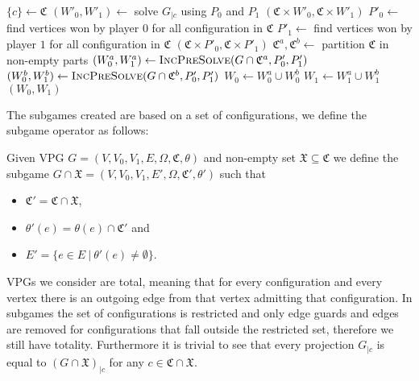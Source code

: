 \begin{algorithm}
	\caption{$\textsc{IncPreSolve}(VPG G = (V,V_0,V_1, E, \Omega, \mathfrak{C}, \theta), P_0,P_1)$}\label{alg_IncPreSolveBasic}
	\begin{algorithmic}[1]
		\State $\{c\} \gets \mathfrak{C}$
		\State $(W'_0,W'_1) \gets $ solve $G_{|c}$ using $P_0$ and $P_1$
		\State \Return $(\mathfrak{C} \times W'_0, \mathfrak{C} \times W'_1)$
		\EndIf
		\State $P'_0 \gets$ find vertices won by player $0$ for all configuration in $\mathfrak{C}$
		\State $P'_1 \gets$ find vertices won by player $1$ for all configuration in $\mathfrak{C}$
		\State \Return $(\mathfrak{C} \times P'_0, \mathfrak{C} \times P'_1)$
		\EndIf
		\State $\mathfrak{C}^a, \mathfrak{C}^b \gets $ partition $\mathfrak{C}$ in non-empty parts
		\State $(W_0^a, W_1^a) \gets \textsc{IncPreSolve}(G \cap \mathfrak{C}^a, P'_0,P'_1)$
		\State $(W_0^b, W_1^b) \gets \textsc{IncPreSolve}(G \cap \mathfrak{C}^b, P'_0,P'_1)$
		\State $W_0 \gets W_0^a \cup W_0^b$
		\State $W_1 \gets W_1^a \cup W_1^b$
		\State \Return $(W_0,W_1)$
	\end{algorithmic}
\end{algorithm}
The subgames created are based on a set of configurations, we define the subgame operator as follows:
\begin{definition}
	Given VPG $G = (V,V_0,V_1,E,\Omega,\mathfrak{C},\theta)$ and non-empty set $\mathfrak{X} \subseteq \mathfrak{C}$ we define the subgame $G \cap \mathfrak{X} = (V,V_0,V_1,E',\Omega,\mathfrak{C}', \theta')$ such that
	\begin{itemize}
		\item $\mathfrak{C}' =\mathfrak{C} \cap \mathfrak{X}$,
		\item $\theta'(e) = \theta(e) \cap \mathfrak{C}'$ and
		\item $E' = \{ e \in E\ |\ \theta'(e) \neq \emptyset \}$.
	\end{itemize}
\end{definition}
VPGs we consider are total, meaning that for every configuration and every vertex there is an outgoing edge from that vertex admitting that configuration. In subgames the set of configurations is restricted and only edge guards and edges are removed for configurations that fall outside the restricted set, therefore we still have totality. Furthermore it is trivial to see that every projection $G_{|c}$ is equal to $(G \cap \mathfrak{X})_{|c}$ for any $c \in \mathfrak{C} \cap \mathfrak{X}$.

